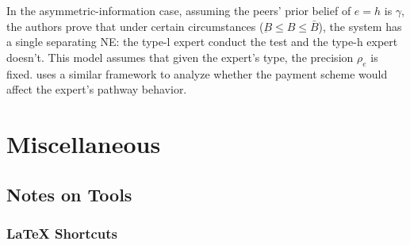 \documentclass[12pt]{report}
\begin{document}
In the asymmetric-information case, assuming the peers' prior belief of $e=h$ is $\gamma$, the authors prove that under certain circumstances ($\underbar{B}\le B\le\bar{B}$), the system has a single separating NE: the type-l expert conduct the test and the type-h expert doesn't. 
This model assumes that given the expert's type, the precision $\rho_e$ is fixed.  
\cite{adida2023impact} uses a similar framework to analyze whether the payment scheme would affect the expert's pathway behavior.

\clearpage
\chapter{Miscellaneous} \label{chap:miscellaneous}

\section{Notes on Tools} \label{sec:notestools}

\subsection{LaTeX Shortcuts}
\end{document}
